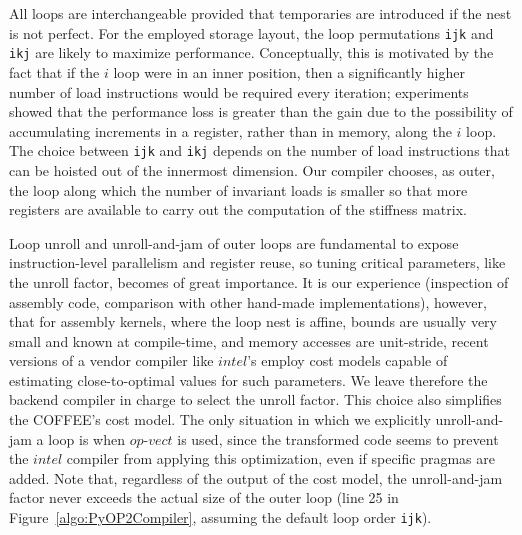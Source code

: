 \documentclass[conference]{IEEEtran}
\begin{document}
All loops are interchangeable provided that temporaries are introduced if the nest is not perfect. For the employed storage layout, the loop permutations \texttt{ijk} and \texttt{ikj} are likely to maximize performance. Conceptually, this is motivated by the fact that if the $i$ loop were in an inner position, then a significantly higher number of load instructions would be required every iteration; experiments showed that the performance loss is greater than the gain due to the possibility of accumulating increments in a register, rather than in memory, along the $i$ loop. The choice between \texttt{ijk} and \texttt{ikj} depends on the number of load instructions that can be hoisted out of the innermost dimension. Our compiler chooses, as outer, the loop along which the number of invariant loads is smaller so that more registers are available to carry out the computation of the stiffness matrix. 

Loop unroll and unroll-and-jam of outer loops are fundamental to expose instruction-level parallelism and register reuse, so tuning critical parameters, like the unroll factor, becomes of great importance. It is our experience (inspection of assembly code, comparison with other hand-made implementations), however, that for assembly kernels, where the loop nest is affine, bounds are usually very small and known at compile-time, and memory accesses are unit-stride, recent versions of a vendor compiler like $intel$'s employ cost models capable of estimating close-to-optimal values for such parameters. We leave therefore the backend compiler in charge to select the unroll factor. This choice also simplifies the COFFEE's cost model. The only situation in which we explicitly unroll-and-jam a loop is when $op$-$vect$ is used, since the transformed code seems to prevent the $intel$ compiler from applying this optimization, even if specific pragmas are added. Note that, regardless of the output of the cost model, the unroll-and-jam factor never exceeds the actual size of the outer loop (line 25 in Figure~\ref{algo:PyOP2Compiler}, assuming the default loop order \texttt{ijk}).
\end{document}
